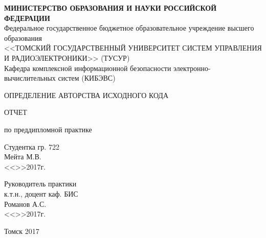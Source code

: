 \newpage
{}

\begin{center}
 \textbf{МИНИСТЕРСТВО ОБРАЗОВАНИЯ И НАУКИ РОССИЙСКОЙ ФЕДЕРАЦИИ}\\
 Федеральное государственное бюджетное образовательное учреждение высшего образования\\
 <<ТОМСКИЙ ГОСУДАРСТВЕННЫЙ УНИВЕРСИТЕТ СИСТЕМ УПРАВЛЕНИЯ И РАДИОЭЛЕКТРОНИКИ>> (ТУСУР)\\
 
 
Кафедра комплексной информационной безопасности электронно-вычислительных систем (КИБЭВС)\\
\end{center}

\vfill


\begin{center}
ОПРЕДЕЛЕНИЕ АВТОРСТВА ИСХОДНОГО КОДА

ОТЧЕТ

по преддипломной практике
\end{center}


\vfill

\begin{flushright}
\begin{minipage}{0.45\textwidth}
 \begin{flushleft}
  Студентка гр. 722 \\
  \underline{\hspace{3cm}} Мейта М.В. \\
  <<\underline{\hspace{1cm}}>>\underline{\hspace{3cm}}2017г.\\
 \end{flushleft}
\end{minipage}
\end{flushright}


\begin{flushright}
\begin{minipage}{0.45\textwidth}
 \begin{flushleft}
  Руководитель практики \\
  к.т.н., доцент каф. БИС \\
  \underline{\hspace{3cm}} Романов А.С. \\
  <<\underline{\hspace{1cm}}>>\underline{\hspace{3cm}}2017г.\\
 \end{flushleft}
\end{minipage}
\end{flushright}


\vfill

\begin{center}
 Томск 2017
\end{center}
